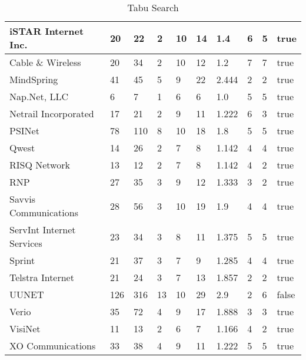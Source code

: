 \documentclass [12pt]{article}
\begin{document}
\begin{table}[H]
\begin{tabular}{ | l | l | l | l | l | l | l | l | l | l |  }
    iSTAR Internet Inc. & 20 & 22 & 2 & 10 & 14 & 1.4 & 6 & 5 & true\\ \hline
    Cable \& Wireless & 20 & 34 & 2 & 10 & 12 & 1.2 & 7 & 7 & true\\ \hline
    MindSpring & 41 & 45 & 5 & 9 & 22 & 2.444 & 2 & 2 & true\\ \hline
    Nap.Net, LLC & 6 & 7 & 1 & 6 & 6 & 1.0 & 5 & 5 & true\\ \hline
    Netrail Incorporated & 17 & 21 & 2 & 9 & 11 & 1.222 & 6 & 3 & true\\ \hline
    PSINet & 78 & 110 & 8 & 10 & 18 & 1.8 & 5 & 5 & true\\ \hline
    Qwest & 14 & 26 & 2 & 7 & 8 & 1.142 & 4 & 4 & true\\ \hline
    RISQ Network & 13 & 12 & 2 & 7 & 8 & 1.142 & 4 & 2 & true\\ \hline
    RNP & 27 & 35 & 3 & 9 & 12 & 1.333 & 3 & 2 & true\\ \hline
    Savvis Communications & 28 & 56 & 3 & 10 & 19 & 1.9 & 4 & 4 & true\\ \hline
    ServInt Internet Services & 23 & 34 & 3 & 8 & 11 & 1.375 & 5 & 5 & true\\ \hline
    Sprint & 21 & 37 & 3 & 7 & 9 & 1.285 & 4 & 4 & true\\ \hline
    Telstra Internet & 21 & 24 & 3 & 7 & 13 & 1.857 & 2 & 2 & true\\ \hline
    UUNET & 126 & 316 & 13 & 10 & 29 & 2.9 & 2 & 6 & false\\ \hline
    Verio & 35 & 72 & 4 & 9 & 17 & 1.888 & 3 & 3 & true\\ \hline
    VisiNet & 11 & 13 & 2 & 6 & 7 & 1.166 & 4 & 2 & true\\ \hline
    XO Communications & 33 & 38 & 4 & 9 & 11 & 1.222 & 5 & 5 & true\\ \hline
  \end{tabular}
  \caption{Tabu Search}
\end{table}
\end{document}
